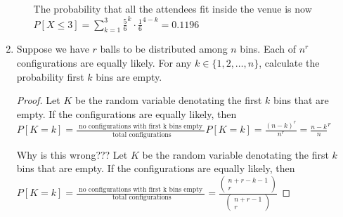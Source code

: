 \documentclass[a4paper]{article}
\begin{document}
\begin{enumerate}
\begin{enumerate}
\begin{note}
          The probability that all the attendees fit inside the venue is now $P[X \leq 3] = \sum_{k=1}^3 \frac{5}{6}
          ^{k} \cdot \frac{1}{6}^{4-k} = 0.1196$ 
        \end{note}
    \end{enumerate}
  \item Suppose we have $r$ balls to be distributed among  $n$ bins. Each of  $n^{r}$ configurations are equally 
    likely. For any $k \in \{1,2,\ldots,n\}$, calculate the probability first $k$ bins are empty.
    \begin{proof}
      Let $K$ be the random variable denotating the first $k$ bins that are empty. If the configurations 
      are equally likely, then $P[K=k] = \frac{\text{ no configurations with first k bins empty }}{\text{ total configurations}}
      P[K = k] = \frac{(n-k)^{r}}{n^r} = \frac{n-k}{n}^{r}$

      Why is this wrong???
      Let $K$ be the random variable denotating the first $k$ bins that are empty. If the configurations 
      are equally likely, then $P[K=k] = \frac{\text{ no configurations with first k bins empty }}{\text{ total configurations}}
      = \frac{\begin{pmatrix} n + r - k - 1 \\ r \end{pmatrix} }{ \begin{pmatrix} n + r - 1 \\ r \end{pmatrix} }$
    \end{proof}
\end{enumerate}
\end{document}
